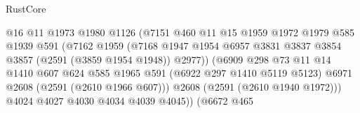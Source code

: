 \begin{lexlean}{RustCore}
\begin{coremodule}
                                        @16
                                        @11
                                        @1973
                                        @1980
                                        @1126
                                        (@7151
                                          @460
                                          @11
                                          @15
                                          @1959
                                          @1972
                                          @1979
                                          @585
                                          @1939
                                          @591
                                          (@7162
                                            @1959
                                            (@7168
                                              @1947
                                              @1954
                                              @6957
                                              @3831
                                              @3837
                                              @3854
                                              @3857
                                              (@2591 (@3859 @1954 @1948))
                                              @2977))
                                          (@6909
                                            @298
                                            @73
                                            @11
                                            @14
                                            @1410
                                            @607
                                            @624
                                            @585
                                            @1965
                                            @591
                                            (@6922 @297 @1410 @5119 @5123)
                                            @6971
                                            @2608
                                            (@2591 (@2610 @1966 @607)))
                                          @2608
                                          (@2591 (@2610 @1940 @1972)))
                                        @4024
                                        @4027
                                        @4030
                                        @4034
                                        @4039
                                        @4045))
                                    (@6672
                                      @465

\end{coremodule}
\end{lexlean}
